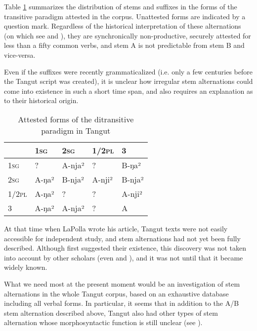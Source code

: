 \documentclass[oldfontcommands,oneside,a4paper,11pt]{article}
\newcommand{\ipa}[1]{{\phon \mbox{#1}}} %
\newcommand{\sg}{\textsc{sg}}
\newcommand{\pl}{\textsc{pl}}
\begin{document}
Table \ref{tab:paradigm} summarizes the distribution of stems and suffixes in the forms of the transitive paradigm attested in the corpus. Unattested forms are indicated by a question mark. Regardless of the historical interpretation of these alternations (on which see \citealt{jacques09tangutverb} and \citealt{jacques14esquisse}), they are synchronically non-productive, securely attested for less than a fifty common verbs, and stem A is not predictable from stem B and vice-versa. %

Even if the suffixes were recently grammaticalized (i.e. only a few centuries before the Tangut script was created), it is unclear how irregular stem alternations could come into existence in such a short time span, and also requires an explanation as to their historical origin.

\begin{table}[H]
\caption{Attested forms of the ditransitive paradigm in Tangut}\centering  \label{tab:paradigm}
\begin{tabular}{lllll}
\toprule
	&	1\sg{}	&	2\sg{}	&	1/2\pl{}	&	3	\\
	\midrule
1\sg{}	&	?	&	A-\ipa{nja²}	&	?	&	 B-\ipa{ŋa²}	\\
2\sg{}	&	A-\ipa{ŋa²}	&	B-\ipa{nja²}	&	A-\ipa{nji²}	&	 B-\ipa{nja²}	\\
1/2\pl{}	&	 A-\ipa{ŋa²}	& ?	&	?	&	A-\ipa{nji²}	\\
3	&	A-\ipa{ŋa²}	&	A-\ipa{nja²}	&	?	&	A 	\\
\bottomrule
\end{tabular}
\end{table}

At that time when LaPolla wrote his article, Tangut texts were not easily accessible for independent study, and stem alternations had not yet been fully described. Although \citet{nishida75} first suggested their existence, this discovery was not taken into account by other scholars (even \citealt{kepping85} and \citealt{driem91tangut}), and it was not until \citet{gong01huying} that it became widely known.

 What we need most at the present moment would be an investigation of stem alternations in the whole Tangut corpus, based on an exhaustive database including all verbal forms. In particular, it seems that in addition to the A/B stem alternation described above, Tangut also had other types of stem alternation whose morphosyntactic function is still unclear (see \citealt{jacques14esquisse}).
\end{document}
